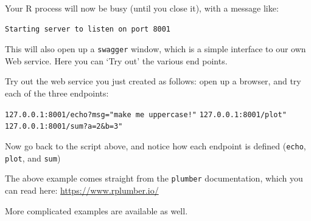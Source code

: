 \documentclass[]{book}
\let\BeginKnitrBlock\begin \let\EndKnitrBlock\end
\begin{document}
Your R process will now be busy (until you close it), with a message like:

\begin{verbatim}
Starting server to listen on port 8001
\end{verbatim}

This will also open up a \texttt{swagger} window, which is a simple interface to our own Web service. Here you can `Try out' the various end points.

\BeginKnitrBlock{rmdtry}
Try out the web service you just created as follows: open up a browser, and try each of the three endpoints:

\texttt{127.0.0.1:8001/echo?msg="make\ me\ uppercase!"}
\texttt{127.0.0.1:8001/plot"}
\texttt{127.0.0.1:8001/sum?a=2\&b=3"}

Now go back to the script above, and notice how each endpoint is defined (\texttt{echo}, \texttt{plot}, and \texttt{sum})
\EndKnitrBlock{rmdtry}

\BeginKnitrBlock{rmdreading}
The above example comes straight from the \texttt{plumber} documentation, which you can read here: \url{https://www.rplumber.io/}

More complicated examples are available as well.
\EndKnitrBlock{rmdreading}


\end{document}

